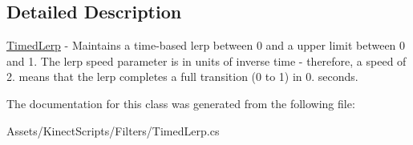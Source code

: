 \subsection{Detailed Description}
\mbox{\hyperlink{class_timed_lerp}{Timed\+Lerp}} -\/ Maintains a time-\/based lerp between 0 and a upper limit between 0 and 1. The lerp speed parameter is in units of inverse time -\/ therefore, a speed of 2. means that the lerp completes a full transition (0 to 1) in 0. seconds. 



The documentation for this class was generated from the following file\+:\begin{DoxyCompactItemize}
\item 
Assets/\+Kinect\+Scripts/\+Filters/Timed\+Lerp.\+cs\end{DoxyCompactItemize}
